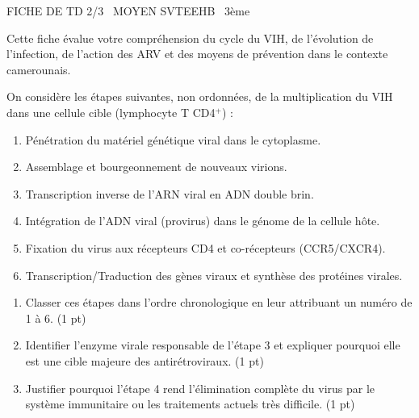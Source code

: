 \documentclass[11pt]{article}
\begin{document}
\begin{tcolorbox}[enhanced,colback=popink,colframe=popink,arc=10pt,boxrule=0pt,left=12pt,right=12pt,top=9pt,bottom=9pt]
{\color{white}\popxbold\small FICHE DE TD 2/3 \textbullet\ MOYEN \hfill SVTEEHB \textbullet\ 3ème\par}
\end{tcolorbox}
\vspace{4pt}
Cette fiche évalue votre compréhension du cycle du VIH, de l'évolution de l'infection, de l'action des ARV et des moyens de prévention dans le contexte camerounais.

\begin{exercice}
On considère les étapes suivantes, non ordonnées, de la multiplication du VIH dans une cellule cible (lymphocyte T CD4$^+$) :
\begin{enumerate}
    \item Pénétration du matériel génétique viral dans le cytoplasme.
    \item Assemblage et bourgeonnement de nouveaux virions.
    \item Transcription inverse de l'ARN viral en ADN double brin.
    \item Intégration de l'ADN viral (provirus) dans le génome de la cellule hôte.
    \item Fixation du virus aux récepteurs CD4 et co-récepteurs (CCR5/CXCR4).
    \item Transcription/Traduction des gènes viraux et synthèse des protéines virales.
\end{enumerate}
\begin{enumerate}
    \item Classer ces étapes dans l'ordre chronologique en leur attribuant un numéro de 1 à 6. \hfill (1 pt)
    \item Identifier l'enzyme virale responsable de l'étape 3 et expliquer pourquoi elle est une cible majeure des antirétroviraux. \hfill (1 pt)
    \item Justifier pourquoi l'étape 4 rend l'élimination complète du virus par le système immunitaire ou les traitements actuels très difficile. \hfill (1 pt)
\end{enumerate}
\end{exercice}
\end{document}
